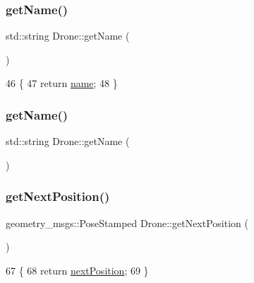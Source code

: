 \mbox{\label{classDrone_a1fcaf0892001bf12b99c838e64878d9e}} 
\subsubsection{\texorpdfstring{get\+Name()}{getName()}\hspace{0.1cm}{\footnotesize\ttfamily [1/2]}}
{\footnotesize\ttfamily std\+::string Drone\+::get\+Name (\begin{DoxyParamCaption}{ }\end{DoxyParamCaption})}


\begin{DoxyCode}
46 \{
47     \textcolor{keywordflow}{return} \hyperlink{classDrone_ac5f6c269378659247acd057142542013}{name};
48 \}
\end{DoxyCode}
\mbox{\label{classDrone_a1fcaf0892001bf12b99c838e64878d9e}} 
\subsubsection{\texorpdfstring{get\+Name()}{getName()}\hspace{0.1cm}{\footnotesize\ttfamily [2/2]}}
{\footnotesize\ttfamily std\+::string Drone\+::get\+Name (\begin{DoxyParamCaption}{ }\end{DoxyParamCaption})}

\mbox{\label{classDrone_a6a6df41b8eae2b1d6c2b66f046fe5a24}} 
\subsubsection{\texorpdfstring{get\+Next\+Position()}{getNextPosition()}\hspace{0.1cm}{\footnotesize\ttfamily [1/2]}}
{\footnotesize\ttfamily geometry\+\_\+msgs\+::\+Pose\+Stamped Drone\+::get\+Next\+Position (\begin{DoxyParamCaption}{ }\end{DoxyParamCaption})}


\begin{DoxyCode}
67 \{
68         \textcolor{keywordflow}{return} \hyperlink{classDrone_a49f95c0480f27c22c122f5bb8482e914}{nextPosition};
69 \}
\end{DoxyCode}
\mbox{\label{classDrone_a6a6df41b8eae2b1d6c2b66f046fe5a24}} 
